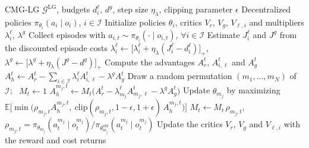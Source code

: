 \documentclass[11pt]{article}
\begin{document}
\begin{algorithm}[H]
\caption{Learning to Coordinate Local and Global Operational Constraints}
\begin{algorithmic}[1]
\REQUIRE CMG-LG $\mathcal{G}^{\mathrm{LG}}$, budgets $d_i^{\ell}$, $d^{g}$, step size $\eta_\lambda$, clipping parameter $\epsilon$
\ENSURE Decentralized policies $\pi_{\theta_i}(a_i\mid o_i)$, $i\in\mathcal{I}$
\STATE Initialize policies $\theta_i$, critics $V_r$, $V_g$, $V_{\ell,i}$ and multipliers $\lambda_i^{\ell}$, $\lambda^{g}$
\STATE Collect episodes with $a_{i,t}\sim\pi_{\theta_i}(\cdot\mid o_{i,t})$, $\forall i\in\mathcal{I}$
\STATE Estimate $J_i^{\ell}$ and $J^{g}$ from the discounted episode costs
\STATE $\lambda_i^{\ell}\leftarrow\big[\lambda_i^{\ell}+\eta_\lambda(J_i^{\ell}-d_i^{\ell})\big]_+$, \quad $\lambda^{g}\leftarrow\big[\lambda^{g}+\eta_\lambda(J^{g}-d^{g})\big]_+$
\STATE Compute the advantages $A_r^t$, $A_{i,\ell}^t$ and $A_g^t$
\STATE $A_h^t\leftarrow A_r^t-\sum_{i\in\mathcal{I}}\lambda_i^{\ell}A_{i,\ell}^t-\lambda^{g}A_g^t$
\STATE Draw a random permutation $(m_1,\dots,m_N)$ of $\mathcal{I}$; \ $M_t\leftarrow1$
\STATE $A_h^{m_j,t}\leftarrow M_t\big(A_r^t-\lambda_{m_j}^{\ell}A_{m_j,\ell}^t-\lambda^{g}A_g^t\big)$
\STATE Update $\theta_{m_j}$ by maximizing $\mathbb{E}\big[\min\big(\rho_{m_j,t}A_h^{m_j,t},\ \mathrm{clip}(\rho_{m_j,t},1-\epsilon,1+\epsilon)\,A_h^{m_j,t}\big)\big]$
\STATE $M_t\leftarrow M_t\,\rho_{m_j,t}$, \quad $\rho_{m_j,t}=\pi_{\theta_{m_j}}(a_t^{m_j}\mid o_t^{m_j})/\pi_{\theta_{m_j}^{\mathrm{old}}}(a_t^{m_j}\mid o_t^{m_j})$
\ENDFOR
\STATE Update the critics $V_r$, $V_g$ and $V_{\ell,i}$ with the reward and cost returns
\ENDFOR
\end{algorithmic}
\end{algorithm}
\end{document}
